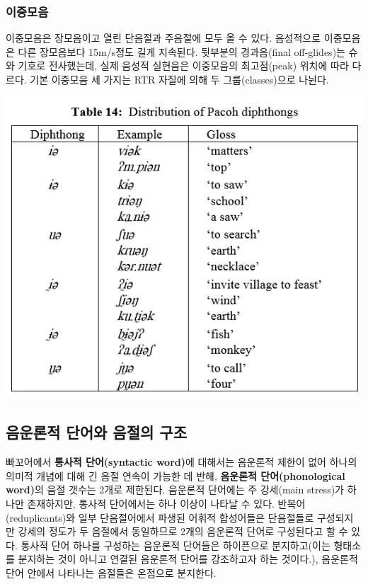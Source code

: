 \subsubsection{이중모음}
이중모음은 장모음이고 열린 단음절과 주음절에 모두 올 수 있다. 음성적으로 이중모음은 다른 장모음보다 15m/s정도 길게 지속된다. 뒷부분의 경과음(final off-glides)는 슈와 기호로 전사했는데, 실제 음성적 실현음은 이중모음의 최고점(peak) 위치에 따라 다르다. 기본 이중모음 세 가지는 RTR 자질에 의해 두 그룹(classes)으로 나뉜다.

\includegraphics{Pacoh/src/PacohTable14.png}

\subsection{음운론적 단어와 음절의 구조}
빠꼬어에서 \textbf{통사적 단어(syntactic word)}에 대해서는 음운론적 제한이 없어 하나의 의미적 개념에 대해 긴 음절 연속이 가능한 데 반해,  \textbf{음운론적 단어(phonological word)}의 음절 갯수는 2개로 제한된다. 
음운론적 단어에는 주 강세(main stress)가 하나만 존재하지만, 통사적 단어에서는 하나 이상이 나타날 수 있다. 반복어(reduplicants)와 일부 단음절어에서 파생된 어휘적 합성어들은 단음절들로 구성되지만 강세의 정도가 두 음절에서 동일하므로 2개의 음운론적 단어로 구성된다고 할 수 있다. 통사적 단어 하나를 구성하는 음운론적 단어들은 하이픈으로 분지하고(이는 형태소를 분지하는 것이 아니고 연결된 음운론적 단어를 강조하고자 하는 것이다.), 음운론적 단어 안에서 나타나는 음절들은 온점으로 분지한다. \\

